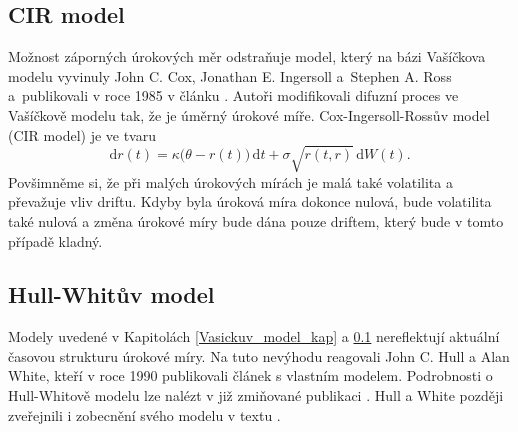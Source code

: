 \documentclass[a4paper,12pt]{report}
\theoremstyle{definition} \newtheorem{definice}[veta]{Definice}
\theoremstyle{remark}
\begin{document}
\subsection{CIR model}\label{CIR_model_kap}
Možnost záporných úrokových měr odstraňuje model, který na bázi Vašíčkova modelu vyvinuly John C. Cox, Jonathan E. Ingersoll a~Stephen A. Ross a~publikovali v roce 1985 v článku \cite{cox1985theory}.
Autoři modifikovali difuzní proces ve Vašíčkově modelu tak, že je úměrný úrokové míře.
Cox-Ingersoll-Rossův model (CIR model) je ve tvaru 
\begin{equation}\label{CIR_model}
\mathrm{d}r(t) = \kappa\big(\theta - r(t)\big)\,\mathrm{d}t + \sigma\sqrt{r(t, r)}\,\mathrm{d}W(t).
\end{equation}
Povšimněme si, že při malých úrokových mírách je malá také volatilita a převažuje vliv driftu. Kdyby byla úroková míra dokonce nulová, bude volatilita také nulová a změna úrokové míry bude dána pouze driftem, který bude v tomto případě kladný.


\subsection{Hull-Whitův model}\label{H-W_model_kap}
Modely uvedené v Kapitolách \ref{Vasickuv_model_kap} a \ref{CIR_model_kap} nereflektují aktuální časovou strukturu úrokové míry.
Na tuto nevýhodu reagovali John C. Hull a Alan White, kteří v roce 1990 publikovali článek \cite{hull1990pricing} s vlastním modelem. %
Podrobnosti o Hull-Whitově modelu lze nalézt v již zmiňované publikaci \cite{brigo2007interest}.
Hull a White později zveřejnili i zobecnění svého modelu v textu \cite{hull2001general}.
\end{document}
